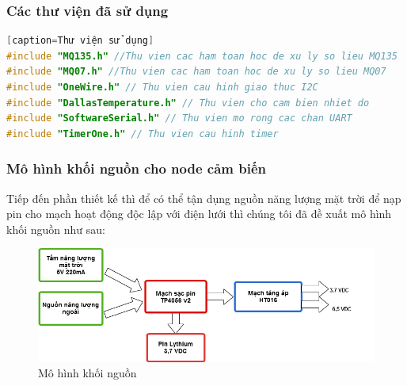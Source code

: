 \subsubsection*{Các thư viện đã sử dụng} 
\begin{lstlisting}[language=C][caption=Thư viện sử dụng]
#include "MQ135.h" //Thu vien cac ham toan hoc de xu ly so lieu MQ135
#include "MQ07.h" //Thu vien cac ham toan hoc de xu ly so lieu MQ07
#include "OneWire.h" // Thu vien cau hinh giao thuc I2C
#include "DallasTemperature.h" // Thu vien cho cam bien nhiet do
#include "SoftwareSerial.h" // Thu vien mo rong cac chan UART
#include "TimerOne.h" // Thu vien cau hinh timer
\end{lstlisting}

\subsubsection*{Mô hình khối nguồn cho node cảm biến}
Tiếp đến phần thiết kế thì để có thể tận dụng nguồn năng lượng mặt trời để nạp pin cho mạch hoạt động độc lập với điện lưới thì chúng tôi đã đề xuất mô hình khối nguồn như sau:
\begin{figure}[H]
\centering    
\includegraphics[width=6in]{khoinguon}
\caption[Mô hình khối nguồn]{Mô hình khối nguồn}
\label{fig:khoinguon}
\end{figure}

